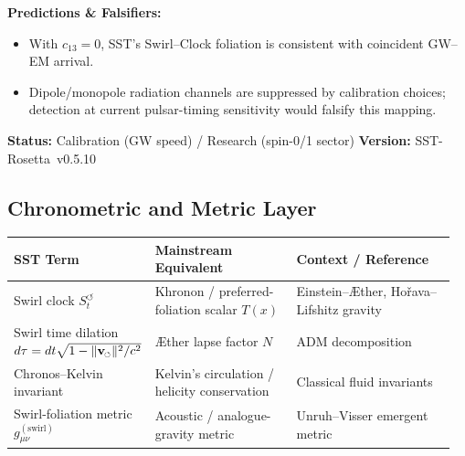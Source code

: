 \documentclass[11pt]{article}
\newcommand{\swirlarrow}{%
	\mathchoice{\mkern-2mu\scriptstyle\boldsymbol{\circlearrowleft}}%
	{\mkern-2mu\scriptstyle\boldsymbol{\circlearrowleft}}%
	{\mkern-2mu\scriptscriptstyle\boldsymbol{\circlearrowleft}}%
	{\mkern-2mu\scriptscriptstyle\boldsymbol{\circlearrowleft}}%
}
\newcommand{\vswirl}{\mathbf{v}_{\swirlarrow}}
\begin{document}
\begin{tcolorbox}[title=Rosetta Card: Einstein–Æther/Khronon $\to$ SST (Swirl–Clock)]
            \begin{center}
                \textbf{Predictions \& Falsifiers:}\\
            \end{center}
            \begin{itemize}\itemsep2pt
            \item With $c_{13}\!=\!0$, SST’s Swirl–Clock foliation is consistent with coincident GW–EM arrival.
            \item Dipole/monopole radiation channels are suppressed by calibration choices; detection at current pulsar-timing sensitivity would falsify this mapping.
            \end{itemize}

            \textbf{Status:} Calibration (GW speed) / Research (spin-0/1 sector) \hfill  \textbf{Version:} SST-Rosetta~v0.5.10
        \end{tcolorbox}



        \subsection*{Chronometric and Metric Layer}
            \footnotesize
            \begin{tabular}{p{0.28\linewidth} p{0.32\linewidth} p{0.36\linewidth}}
                \textbf{SST Term} & \textbf{Mainstream Equivalent} & \textbf{Context / Reference}\\
                \hline
                Swirl clock \(S_t^{\boldsymbol{\circlearrowleft}}\) &
                Khronon / preferred-foliation scalar \(T(x)\) &
                Einstein–Æther, Hořava–Lifshitz gravity \cite{Jacobson2001,Blas2011}\\
                Swirl time dilation \(d\tau = dt\sqrt{1-\lVert\vswirl\rVert^2/c^2}\) &
                Æther lapse factor \(N\) &
                ADM decomposition\\
                Chronos–Kelvin invariant &
                Kelvin’s circulation / helicity conservation &
                Classical fluid invariants \cite{Saffman1992}\\
                Swirl-foliation metric \(g_{\mu\nu}^{(\mathrm{swirl})}\) &
                Acoustic / analogue-gravity metric &
                Unruh–Visser emergent metric \cite{Unruh1981PRL}\\
            \end{tabular}
\end{document}
